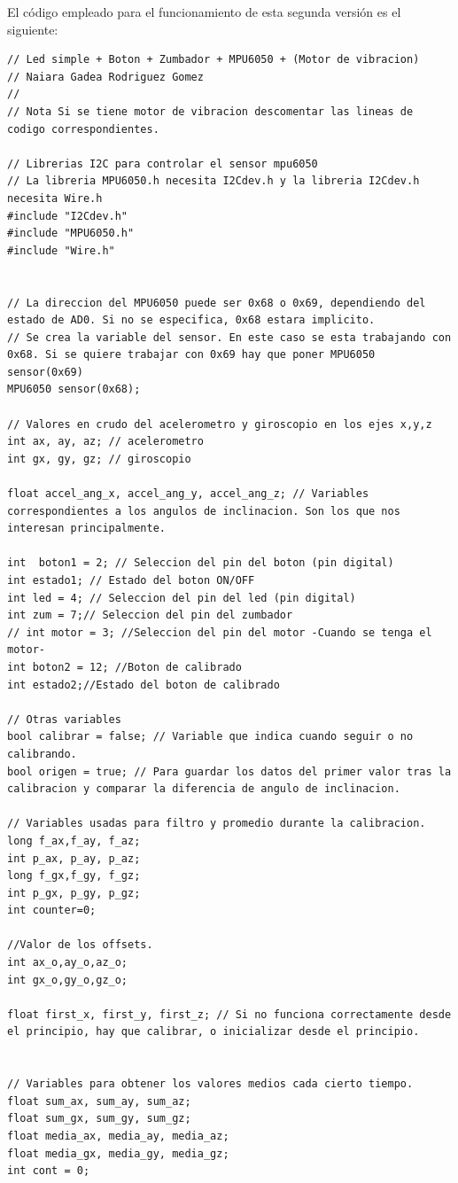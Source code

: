 \newpage
El código empleado para el funcionamiento de esta segunda versión es el siguiente:
\begin{lstlisting}
// Led simple + Boton + Zumbador + MPU6050 + (Motor de vibracion)
// Naiara Gadea Rodriguez Gomez
// 
// Nota Si se tiene motor de vibracion descomentar las lineas de codigo correspondientes.

// Librerias I2C para controlar el sensor mpu6050 
// La libreria MPU6050.h necesita I2Cdev.h y la libreria I2Cdev.h necesita Wire.h 
#include "I2Cdev.h" 
#include "MPU6050.h" 
#include "Wire.h" 


// La direccion del MPU6050 puede ser 0x68 o 0x69, dependiendo del estado de AD0. Si no se especifica, 0x68 estara implicito.
// Se crea la variable del sensor. En este caso se esta trabajando con 0x68. Si se quiere trabajar con 0x69 hay que poner MPU6050 sensor(0x69) 
MPU6050 sensor(0x68); 

// Valores en crudo del acelerometro y giroscopio en los ejes x,y,z 
int ax, ay, az; // acelerometro 
int gx, gy, gz; // giroscopio 

float accel_ang_x, accel_ang_y, accel_ang_z; // Variables correspondientes a los angulos de inclinacion. Son los que nos interesan principalmente.

int  boton1 = 2; // Seleccion del pin del boton (pin digital)
int estado1; // Estado del boton ON/OFF
int led = 4; // Seleccion del pin del led (pin digital)
int zum = 7;// Seleccion del pin del zumbador
// int motor = 3; //Seleccion del pin del motor -Cuando se tenga el motor-
int boton2 = 12; //Boton de calibrado
int estado2;//Estado del boton de calibrado

// Otras variables
bool calibrar = false; // Variable que indica cuando seguir o no calibrando.
bool origen = true; // Para guardar los datos del primer valor tras la calibracion y comparar la diferencia de angulo de inclinacion.

// Variables usadas para filtro y promedio durante la calibracion. 
long f_ax,f_ay, f_az; 
int p_ax, p_ay, p_az; 
long f_gx,f_gy, f_gz; 
int p_gx, p_gy, p_gz; 
int counter=0;

//Valor de los offsets.
int ax_o,ay_o,az_o; 
int gx_o,gy_o,gz_o; 

float first_x, first_y, first_z; // Si no funciona correctamente desde el principio, hay que calibrar, o inicializar desde el principio.


// Variables para obtener los valores medios cada cierto tiempo.
float sum_ax, sum_ay, sum_az;
float sum_gx, sum_gy, sum_gz;
float media_ax, media_ay, media_az;
float media_gx, media_gy, media_gz;
int cont = 0;


\end{lstlisting}

